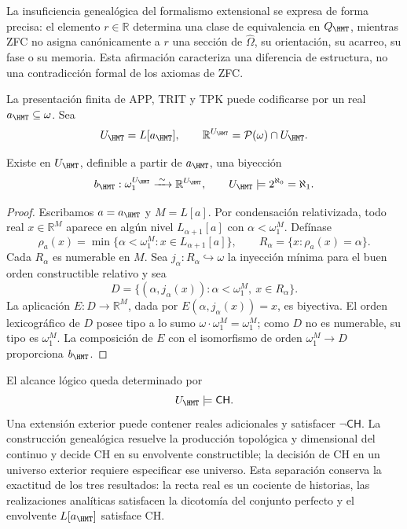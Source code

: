 La insuficiencia genealógica del formalismo extensional se expresa de forma
precisa: el elemento \(r\in\mathbb R\) determina una clase de equivalencia en
\(Q_{\HMT}\), mientras ZFC no asigna canónicamente a \(r\) una sección de
\(\widehat\Omega\), su orientación, su acarreo, su fase o su memoria. Esta
afirmación caracteriza una diferencia de estructura, no una contradicción
formal de los axiomas de ZFC.

La presentación finita de APP, TRIT y TPK puede codificarse por un real
\(a_{\HMT}\subseteq\omega\). Sea
\begin{equation}
 U_{\HMT}=L[a_{\HMT}],
 \qquad
 \mathbb R^{U_{\HMT}}=\mathcal P(\omega)\cap U_{\HMT}.
 \label{eq:universo-constructible-hmt}
\end{equation}

\begin{theorem}
\label{thm:ch-envolvente-constructible}
Existe en \(U_{\HMT}\), definible a partir de \(a_{\HMT}\), una biyección
\begin{equation}
 b_{\HMT}:\omega_1^{U_{\HMT}}
 \xrightarrow{\;\sim\;}\mathbb R^{U_{\HMT}},
 \qquad
 U_{\HMT}\models 2^{\aleph_0}=\aleph_1.
 \label{eq:biyeccion-ch-envolvente}
\end{equation}
\end{theorem}

\begin{proof}
Escribamos \(a=a_{\HMT}\) y \(M=L[a]\). Por condensación relativizada, todo
real \(x\in\mathbb R^M\) aparece en algún nivel
\(L_{\alpha+1}[a]\) con \(\alpha<\omega_1^M\). Defínase
\[
 \rho_a(x)=\min\{\alpha<\omega_1^M:x\in L_{\alpha+1}[a]\},
 \qquad
 R_\alpha=\{x:\rho_a(x)=\alpha\}.
\]
Cada \(R_\alpha\) es numerable en \(M\). Sea
\(j_\alpha:R_\alpha\hookrightarrow\omega\) la inyección mínima para el buen
orden constructible relativo y sea
\[
 D=\{(\alpha,j_\alpha(x)):
 \alpha<\omega_1^M,\ x\in R_\alpha\}.
\]
La aplicación \(E:D\to\mathbb R^M\), dada por
\(E(\alpha,j_\alpha(x))=x\), es biyectiva. El orden lexicográfico de \(D\)
posee tipo a lo sumo
\(\omega\cdot\omega_1^M=\omega_1^M\); como \(D\) no es numerable, su tipo
es \(\omega_1^M\). La composición de \(E\) con el isomorfismo de orden
\(\omega_1^M\to D\) proporciona \(b_{\HMT}\).
\end{proof}

El alcance lógico queda determinado por
\begin{equation}
 U_{\HMT}\models\mathsf{CH}.
 \label{eq:alcance-interno-ch}
\end{equation}
Una extensión exterior puede contener reales adicionales y satisfacer
\(\neg\mathsf{CH}\). La construcción genealógica resuelve la producción
topológica y dimensional del continuo y decide CH en su envolvente
constructible; la decisión de CH en un universo exterior requiere especificar
ese universo. Esta separación conserva la exactitud de los tres resultados:
la recta real es un cociente de historias, las realizaciones analíticas
satisfacen la dicotomía del conjunto perfecto y el envolvente
\(L[a_{\HMT}]\) satisface CH.
